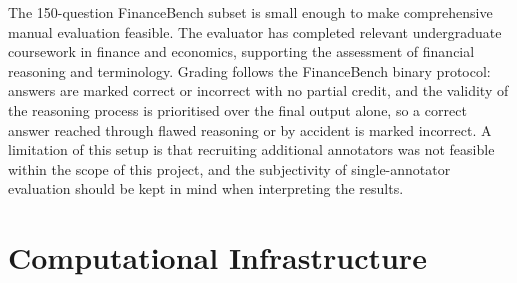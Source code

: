 \documentclass[12pt,twoside,maitrise]{dms}
\theoremstyle{definition}
\numberwithin{equation}{section}
\numberwithin{table}{chapter}
\numberwithin{figure}{chapter}
\begin{document}
The 150-question FinanceBench subset is small enough to make comprehensive manual evaluation feasible. The evaluator has completed relevant undergraduate coursework in finance and economics, supporting the assessment of financial reasoning and terminology. Grading follows the FinanceBench binary protocol: answers are marked correct or incorrect with no partial credit, and the validity of the reasoning process is prioritised over the final output alone, so a correct answer reached through flawed reasoning or by accident is marked incorrect. A limitation of this setup is that recruiting additional annotators was not feasible within the scope of this project, and the subjectivity of single-annotator evaluation should be kept in mind when interpreting the results.




\section{Computational Infrastructure}
\label{sec:infrastructure}
\end{document}
